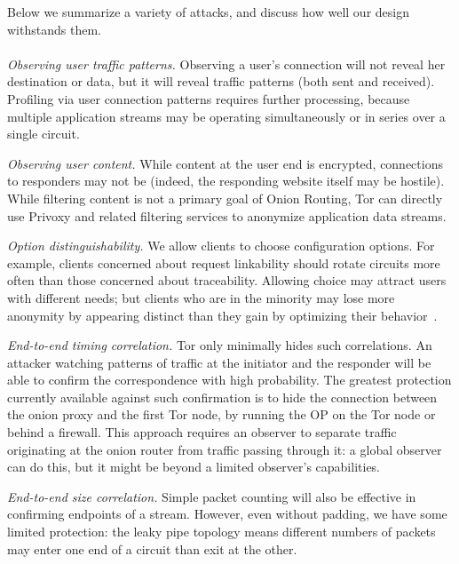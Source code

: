 \documentclass[times,10pt,twocolumn]{article}
\begin{document}
\label{sec:attacks}

Below we summarize a variety of attacks, and discuss how well our
design withstands them.\\

\\
\emph{Observing user traffic patterns.} Observing a user's connection
will not reveal her destination or data, but it will
reveal traffic patterns (both sent and received). Profiling via user
connection patterns requires further processing, because multiple
application streams may be operating simultaneously or in series over
a single circuit.

\emph{Observing user content.} While content at the user end is encrypted,
connections to responders may not be (indeed, the responding website
itself may be hostile). While filtering content is not a primary goal
of Onion Routing, Tor can directly use Privoxy and related
filtering services to anonymize application data streams.

\emph{Option distinguishability.} We allow clients to choose
configuration options. For example, clients concerned about request
linkability should rotate circuits more often than those concerned
about traceability. Allowing choice may attract users with different 
needs; but clients who are
in the minority may lose more anonymity by appearing distinct than they
gain by optimizing their behavior~\cite{econymics}.

\emph{End-to-end timing correlation.}  Tor only minimally hides
such correlations. An attacker watching patterns of
traffic at the initiator and the responder will be
able to confirm the correspondence with high probability. The
greatest protection currently available against such confirmation is to hide
the connection between the onion proxy and the first Tor node,
by running the OP on the Tor node or behind a firewall. This approach
requires an observer to separate traffic originating at the onion
router from traffic passing through it: a global observer can do this,
but it might be beyond a limited observer's capabilities.

\emph{End-to-end size correlation.} Simple packet counting
will also be effective in confirming
endpoints of a stream. However, even without padding, we have some
limited protection: the leaky pipe topology means different numbers
of packets may enter one end of a circuit than exit at the other.
\end{document}
